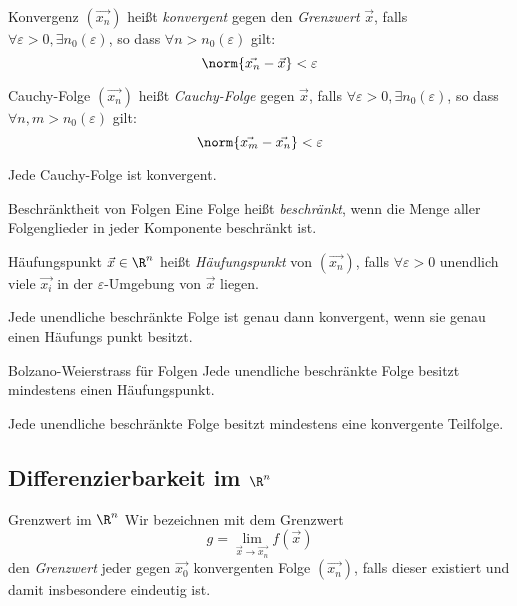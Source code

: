 \documentclass[german]{../spicker}
\begin{document}
\begin{defi}{Konvergenz}
    $(\vec{x_n})$ heißt \emph{konvergent} gegen den \emph{Grenzwert} $\vec{x}$, falls $\forall \varepsilon >0, \exists n_0(\varepsilon)$, so dass $\forall n > n_0(\varepsilon)$ gilt:
    $$
        \norm{\vec{x_n} - \vec{x}} < \varepsilon
    $$
\end{defi}

\begin{defi}{Cauchy-Folge}
    $(\vec{x_n})$ heißt \emph{Cauchy-Folge} gegen $\vec{x}$, falls $\forall \varepsilon >0, \exists n_0(\varepsilon)$, so dass $\forall n,m > n_0(\varepsilon)$ gilt:
    $$
        \norm{\vec{x_m} - \vec{x_n}} < \varepsilon
    $$

    Jede Cauchy-Folge ist konvergent.
\end{defi}

\begin{defi}{Beschränktheit von Folgen}
    Eine Folge heißt \emph{beschränkt}, wenn die Menge aller Folgenglieder in jeder Komponente beschränkt ist.
\end{defi}

\begin{defi}{Häufungspunkt}
    $\vec{x} \in \R^n$ heißt \emph{Häufungspunkt} von $(\vec{x_n})$, falls $\forall \varepsilon > 0$ unendlich viele $\vec{x_i}$ in der $\varepsilon$-Umgebung von $\vec{x}$ liegen.

    Jede unendliche beschränkte Folge ist genau dann konvergent, wenn sie genau einen Häufungs\- punkt besitzt.
\end{defi}

\begin{defi}{Bolzano-Weierstrass für Folgen}
    Jede unendliche beschränkte Folge besitzt mindestens einen Häufungspunkt.

    Jede unendliche beschränkte Folge besitzt mindestens eine konvergente Teilfolge.
\end{defi}

\subsection{Differenzierbarkeit im $\R^n$}

\begin{defi}{Grenzwert im $\R^n$}
    Wir bezeichnen mit dem Grenzwert
    $$
        g = \lim_{\vec{x} \to \vec{x_n}} f(\vec{x})
    $$
    den \emph{Grenzwert} jeder gegen $\vec{x_0}$ konvergenten Folge $(\vec{x_n})$, falls dieser existiert und damit insbesondere eindeutig ist.
\end{defi}
\end{document}
